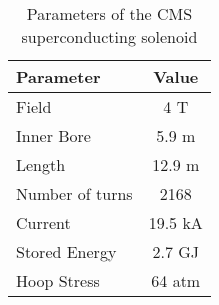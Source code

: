 \begin{table}[!htb]
  \centering
  \begin{tabular}{|l|c|}
  \hline
  Parameter & Value \\
  \hline\hline
  Field           & 4 T \\
  Inner Bore      & 5.9 m \\
  Length          & 12.9 m \\
  Number of turns & 2168 \\
  Current         & 19.5 kA \\
  Stored Energy   & 2.7 GJ \\
  Hoop Stress     & 64 atm \\
  \hline
  \end{tabular}
  \caption[Parameters of the CMS superconducting solenoid]{Parameters of the CMS superconducting solenoid}
  \label{TABLE:ExperimentalApparatus_CMSMagnetParameters}
\end{table}
